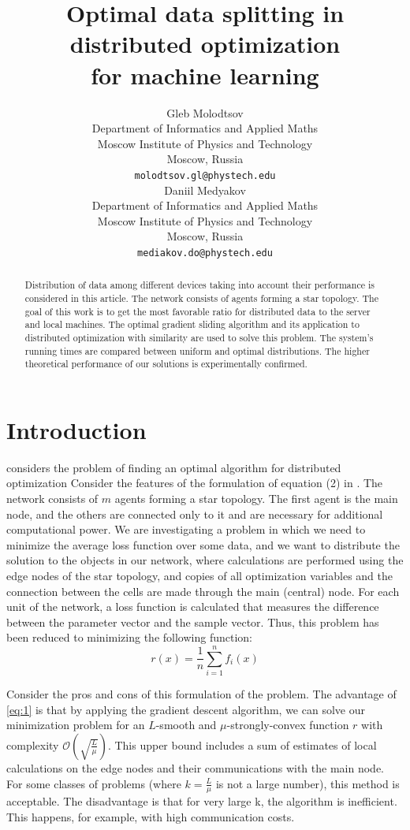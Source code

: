 \documentclass{article}
\title{Optimal data splitting in distributed optimization \\for machine learning}
\author{Gleb Molodtsov
    \\
	Department of Informatics and Applied Maths \\
	Moscow Institute of Physics and Technology\\
	Moscow, Russia\\
	\texttt{molodtsov.gl@phystech.edu} \\
	\And
	Daniil Medyakov \\
	Department of Informatics and Applied Maths \\
	Moscow Institute of Physics and Technology\\
	Moscow, Russia \\
	\texttt{mediakov.do@phystech.edu} \\
}
\date{}
\begin{document}
\maketitle

\begin{abstract}
Distribution of data among different devices taking into account their performance is considered in this article. The network consists of agents forming a star topology. The goal of this work is to get the most favorable ratio for distributed data to the server and local machines. The optimal gradient sliding algorithm and its application to distributed optimization with similarity are used to solve this problem. The system's running times are compared between uniform and optimal distributions. The higher theoretical performance of our solutions is experimentally confirmed. 
\end{abstract}




\section{Introduction}
\cite{kovalev2022optimal} considers the problem of finding an optimal algorithm for distributed optimization
Consider the features of the formulation of equation (2) in \cite{kovalev2022optimal}. The network consists of $m$ agents forming a star topology. The first agent is the main node, and the others are connected only to it and are necessary for additional computational power. We are investigating a problem in which we need to minimize the average loss function over some data, and we want to distribute the solution to the objects in our network, where calculations are performed using the edge nodes of the star topology, and copies of all optimization variables and the connection between the cells are made through the main (central) node. For each unit of the network, a loss function is calculated that measures the difference between the parameter vector and the sample vector. Thus, this problem has been reduced to minimizing the following function:
\\
\begin{equation}
    \label{eq:1}
    r(x) = \frac{1}{n} \sum \limits_{i = 1}^{n} f _i(x)
\end{equation}

Consider the pros and cons of this formulation of the problem.
The advantage of \ref{eq:1} is that by applying the gradient descent algorithm, we can solve our minimization problem for an $L$-smooth and $\mu$-strongly-convex function $r$ with complexity $\mathcal{O}(\sqrt{\frac{L}{\mu}})$. This upper bound includes a sum of estimates of local calculations on the edge nodes and their communications with the main node. For some classes of problems (where $k = \frac{L}{\mu}$ is not a large number), this method is acceptable. The disadvantage is that for very large k, the algorithm is inefficient. This happens, for example, with high communication costs.
\end{document}
